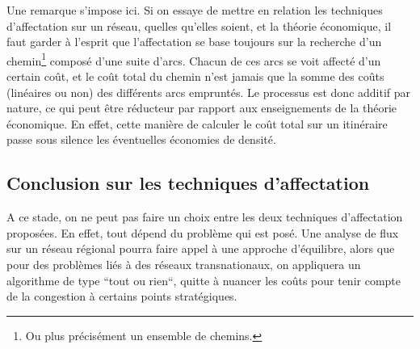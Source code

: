 Une remarque s'impose ici. Si on essaye de mettre en relation les
techniques d'affectation sur un réseau, quelles qu'elles soient, et
la théorie économique, il faut garder à l'esprit que l'affectation
se base toujours sur la recherche d'un chemin\footnote{Ou plus
précisément un ensemble de chemins.} composé d'une suite d'arcs.
Chacun de ces arcs se voit affecté d'un certain coût, et le coût
total du chemin n'est jamais que la somme des coûts (linéaires ou
non) des différents arcs empruntés. Le processus est donc additif
par nature, ce qui peut être réducteur par rapport aux
enseignements de la théorie économique. En effet, cette manière de
calculer le coût total sur un itinéraire passe sous silence les
éventuelles économies de densité.


\subsection{Conclusion sur les techniques d'affectation}


A ce stade, on ne peut pas faire un choix entre les deux techniques
d'affectation proposées. En effet, tout dépend du problème qui est posé. Une
analyse de flux sur un réseau régional pourra faire appel à une approche
d'équilibre, alors que pour des problèmes liés à des réseaux transnationaux, on
appliquera un algorithme de type ``tout ou rien``, quitte à nuancer les coûts
pour tenir compte de la congestion à certains points stratégiques.

